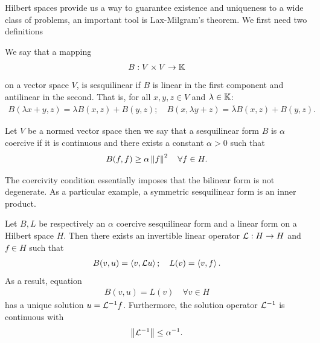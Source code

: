 \documentclass[
    a4paper,
    DIV=14,
    abstract=true,
    numbers=noenddot
]{scrartcl}
\begin{document}
	Hilbert spaces provide us a way to guarantee existence and uniqueness to a wide class of problems, an important tool is Lax-Milgram's theorem. We first need two definitions
	\begin{definition}
		We say that a mapping
		\begin{align*}
			B:V \times V \to \mathbb{K}
		\end{align*}
		on a vector space $V$, is sesquilinear if $B$ is linear in the first component and antilinear in the second. That is, for all $x,y,z \in V$ and $\lambda \in \mathbb{K}$:
		\begin{align*}
			{B(\lambda x+y,z)}= \lambda B({x,z})+ B({y,z}); \quad B(x,\lambda y+z)= \overline{\lambda} B({x,z})+ B({y,z}) .
		\end{align*}
	\end{definition}
	\begin{definition}
		Let $V$ be a normed vector space then we say that a sesquilinear form  $B$ is $\alpha$ coercive if it is continuous and there exists a constant $\alpha>0$ such that
		\begin{align*}
			B(f,f)\geq \alpha\left\lVert f \right\rVert^2 \quad\forall f \in  H.
		\end{align*}
	\end{definition}
	The coercivity condition essentially imposes that the bilinear form is not degenerate. As a particular example, a symmetric sesquilinear form is an inner product.
	\begin{theorem}\label{Lax theorem}
		Let $B, L $ be respectively an $\alpha$ coercive sesquilinear form and a linear form on a Hilbert space $H$. Then there exists an invertible linear operator $\mathcal{L}:H \to H$ and $f \in H$ such that
		\begin{align*}
			B(v,u)=\left\langle v,\mathcal{L} u\right\rangle; \quad L(v)=\left\langle v,f\right\rangle.
		\end{align*}
		As a result, equation
		\begin{align}\label{lax eq}
			B(v,u)=L(v) \quad\forall v \in H
		\end{align}
		has a unique solution $u= \mathcal{L}^{-1} f $. Furthermore, the solution operator $\mathcal{L}^{-1}$ is continuous with \begin{align*}
			\left\lVert \mathcal{L}^{-1} \right\rVert\leq \alpha^{-1} .
		\end{align*}
	\end{theorem}
\end{document}
